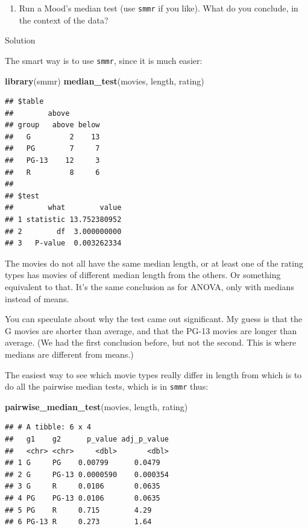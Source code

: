 \documentclass[]{tufte-book}
\newenvironment{Shaded}{}{}
\newcommand{\KeywordTok}[1]{\textcolor[rgb]{0.00,0.44,0.13}{\textbf{#1}}}
\newcommand{\NormalTok}[1]{#1}
\providecommand{\tightlist}{%
  \setlength{\itemsep}{0pt}\setlength{\parskip}{0pt}}
\theoremstyle{definition}
\theoremstyle{definition}
\theoremstyle{definition}
\theoremstyle{remark}
\begin{document}
\begin{enumerate}
\def\labelenumi{(\alph{enumi})}
\setcounter{enumi}{2}
\tightlist
\item
  Run a Mood's median test (use \texttt{smmr} if you like). What do you
  conclude, in the context of the data?
\end{enumerate}

Solution

The smart way is to use \texttt{smmr}, since it is much easier:

\begin{Shaded}
\begin{Highlighting}[]
\KeywordTok{library}\NormalTok{(smmr)}
\KeywordTok{median_test}\NormalTok{(movies, length, rating)}
\end{Highlighting}
\end{Shaded}

\begin{verbatim}
## $table
##        above
## group   above below
##   G         2    13
##   PG        7     7
##   PG-13    12     3
##   R         8     6
## 
## $test
##        what        value
## 1 statistic 13.752380952
## 2        df  3.000000000
## 3   P-value  0.003262334
\end{verbatim}

The movies do not all have the same median length, or at least one of
the rating types has movies of different median length from the others.
Or something equivalent to that. It's the same conclusion as for ANOVA,
only with medians instead of means.

You can speculate about why the test came out significant. My guess is
that the G movies are shorter than average, and that the PG-13 movies
are longer than average. (We had the first conclusion before, but not
the second. This is where medians are different from means.)

The easiest way to see which movie types really differ in length from
which is to do all the pairwise median tests, which is in \texttt{smmr}
thus:

\begin{Shaded}
\begin{Highlighting}[]
\KeywordTok{pairwise_median_test}\NormalTok{(movies, length, rating)}
\end{Highlighting}
\end{Shaded}

\begin{verbatim}
## # A tibble: 6 x 4
##   g1    g2      p_value adj_p_value
##   <chr> <chr>     <dbl>       <dbl>
## 1 G     PG    0.00799      0.0479  
## 2 G     PG-13 0.0000590    0.000354
## 3 G     R     0.0106       0.0635  
## 4 PG    PG-13 0.0106       0.0635  
## 5 PG    R     0.715        4.29    
## 6 PG-13 R     0.273        1.64
\end{verbatim}
\end{document}
